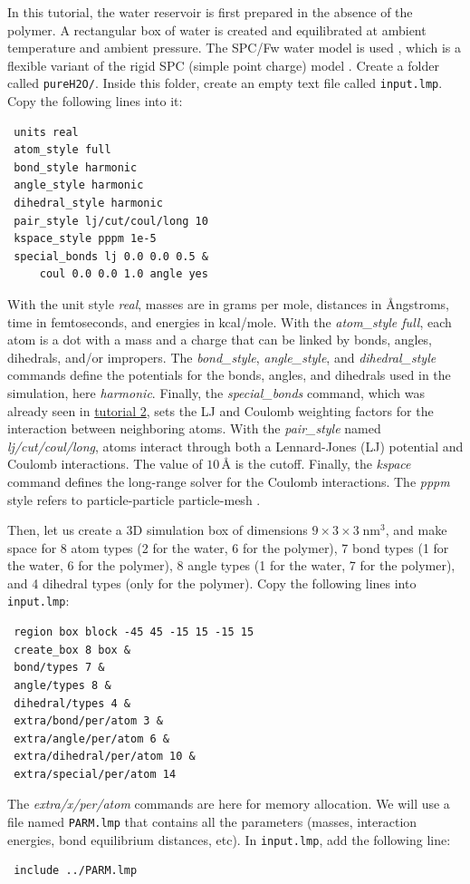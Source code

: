 \documentclass[9pt,tutorial]{livecoms}
\newcommand{\flrcmd}[1]{\textcolor{command}{\texttt{#1}}} %
\newcommand{\flecmd}[1]{\textcolor{command}{\texttt{#1}}} %
\begin{document}
In this tutorial, the water reservoir is first prepared in the absence of the polymer.
A rectangular box of water is created and equilibrated at ambient temperature and
ambient pressure. The SPC/Fw water model is used \cite{wu2006flexible}, which is
a flexible variant of the rigid SPC (simple point charge) model \cite{berendsen1981interaction}.
Create a folder called \flrcmd{pureH2O/}. Inside this folder, create an empty text
file called \flecmd{input.lmp}. Copy the following lines into it:
\begin{lstlisting}
 units real
 atom_style full
 bond_style harmonic
 angle_style harmonic
 dihedral_style harmonic
 pair_style lj/cut/coul/long 10
 kspace_style pppm 1e-5
 special_bonds lj 0.0 0.0 0.5 &
     coul 0.0 0.0 1.0 angle yes
\end{lstlisting}
With the unit style \textit{real}, masses are in grams per mole, distances in
Ångstroms, time in femtoseconds, and energies in kcal/mole. With the \textit{atom\_style full}, each atom is a dot with a mass and a charge that can be linked by bonds, angles, dihedrals, and/or impropers. The \textit{bond\_style},
\textit{angle\_style}, and \textit{dihedral\_style} commands define the potentials
for the bonds, angles, and dihedrals used in the simulation, here \textit{harmonic}.
Finally, the \textit{special\_bonds} command, which was already seen in
\hyperref[carbon-nanotube-label]{tutorial 2}, sets the LJ and Coulomb weighting
factors for the interaction between neighboring atoms. With the \textit{pair\_style}
named \textit{lj/cut/coul/long}, atoms interact through both a Lennard-Jones (LJ)
potential and Coulomb interactions. The value of $10\,\text{\AA{}}$ is the cutoff.
Finally, the \textit{kspace} command defines the long-range solver for the Coulomb
interactions. The \textit{pppm} style refers to particle-particle particle-mesh \cite{luty1996calculating}.

Then, let us create a 3D simulation box of dimensions $9 \times 3 \times 3 \; \text{nm}^3$,
and make space for 8 atom types (2 for the water, 6 for the polymer), 7 bond types
(1 for the water, 6 for the polymer), 8 angle types (1 for the water, 7 for the polymer),
and 4 dihedral types (only for the polymer). Copy the following lines into \flecmd{input.lmp}:
\begin{lstlisting}
 region box block -45 45 -15 15 -15 15
 create_box 8 box &
 bond/types 7 &
 angle/types 8 &
 dihedral/types 4 &
 extra/bond/per/atom 3 &
 extra/angle/per/atom 6 &
 extra/dihedral/per/atom 10 &
 extra/special/per/atom 14
\end{lstlisting}
The \textit{extra/x/per/atom} commands are here for
memory allocation. We will use a file named \flecmd{PARM.lmp} that contains
all the parameters (masses, interaction energies, bond equilibrium
distances, etc). In \flecmd{input.lmp}, add the following line:
\begin{lstlisting}
 include ../PARM.lmp
\end{lstlisting}
\end{document}

